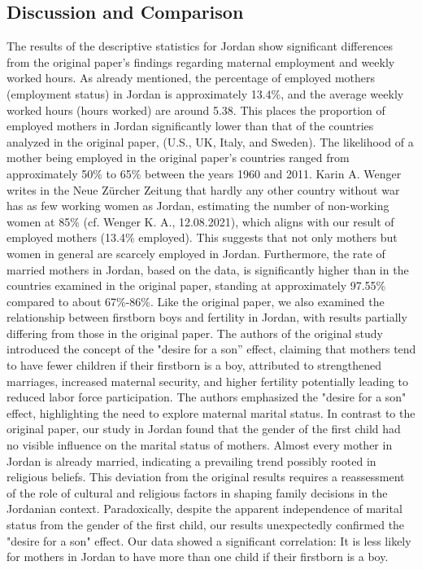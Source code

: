 \documentclass[12pt,draft,a4paper]{article}
\begin{document}
\subsection{Discussion and Comparison}
The results of the descriptive statistics for Jordan show significant differences from the original paper's findings regarding maternal employment and weekly worked hours. 
As already mentioned, the percentage of employed mothers (employment status) in Jordan is approximately 13.4\%, and the average weekly worked hours (hours worked) are around 5.38. 
This places the proportion of employed mothers in Jordan significantly lower than that of the countries analyzed in the original paper, (U.S., UK, Italy, and Sweden). 
The likelihood of a mother being employed in the original paper's countries ranged from approximately 50\% to 65\% between the years 1960 and 2011. 
Karin A. Wenger writes in the Neue Zürcher Zeitung that hardly any other country without war has as few working women as Jordan, estimating the number of non-working women at 85\% (cf. Wenger K. A., 12.08.2021), 
which aligns with our result of employed mothers (13.4\% employed).
This suggests that not only mothers but women in general are scarcely employed in Jordan. 
Furthermore, the rate of married mothers in Jordan, based on the data, is significantly higher than in the countries examined in the original paper, standing at approximately 97.55\% compared to about 67\%-86\%. 
Like the original paper, we also examined the relationship between firstborn boys and fertility in Jordan, with results partially differing from those in the original paper.
The authors of the original study introduced the concept of the "desire for a son” effect, claiming that mothers tend to have fewer children if their firstborn is a boy, 
attributed to strengthened marriages, increased maternal security, and higher fertility potentially leading to reduced labor force participation. 
The authors emphasized the "desire for a son" effect, highlighting the need to explore maternal marital status. 
In contrast to the original paper, our study in Jordan found that the gender of the first child had no visible influence on the marital status of mothers. 
Almost every mother in Jordan is already married, indicating a prevailing trend possibly rooted in religious beliefs. 
This deviation from the original results requires a reassessment of the role of cultural and religious factors in shaping family decisions in the Jordanian context. 
Paradoxically, despite the apparent independence of marital status from the gender of the first child, our results unexpectedly confirmed the "desire for a son" effect. 
Our data showed a significant correlation: It is less likely for mothers in Jordan to have more than one child if their firstborn is a boy. 
\end{document}
